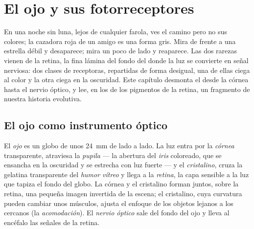 \chapter{El ojo y sus fotorreceptores}\label{ch:g11:the-eye}

En una noche sin luna, lejos de cualquier farola, ves el camino pero no
sus colores; la cazadora roja de un amigo es una forma gris. Mira de
frente a una estrella débil y desaparece; mira un poco de lado y
reaparece. Las dos rarezas vienen de la retina, la fina lámina del
fondo del  donde la luz se convierte en señal nerviosa: dos clases
de  receptoras, repartidas de forma desigual, una de ellas ciega
al color y la otra ciega en la oscuridad. Este capítulo desmonta el 
desde la córnea hasta el nervio óptico, y lee, en los  de los
pigmentos de la retina, un fragmento de nuestra historia evolutiva.

\section{El ojo como instrumento óptico}

\begin{definition}\label{def:g11:the-eye:parts}
El \emph{ojo} es un globo de unos \qty{24}{mm} de lado a
lado. La luz entra por la \emph{córnea} transparente, atraviesa la
\emph{pupila} --- la abertura del \emph{iris} coloreado, que se ensancha
en la oscuridad y se estrecha con luz fuerte --- y el
\emph{cristalino}, cruza la gelatina transparente del \emph{humor
vítreo} y llega a la \emph{retina}, la capa sensible a la luz que
tapiza el fondo del globo. La córnea y el cristalino forman juntos,
sobre la retina, una pequeña imagen invertida de la escena; el
cristalino, cuya curvatura pueden cambiar unos músculos, ajusta el
enfoque de los objetos lejanos a los cercanos (la
\emph{acomodación}). El \emph{nervio óptico} sale del fondo del ojo y
lleva al encéfalo las señales de la retina.
\end{definition}

